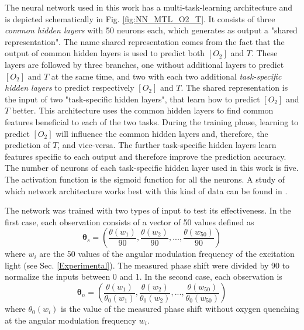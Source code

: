 \documentclass[sensors,article,submit,moreauthors,pdftex,10pt,a4paper]{Definitions/mdpi}
\begin{document}
The neural network used in this work has a multi-task-learning architecture and is depicted schematically in Fig. \ref{fig:NN_MTL_O2_T}. It consists of three {\sl common hidden layers} with 50 neurons each, which generates as output a "shared representation". The name shared representation comes from the fact that the output of common hidden layers is used to predict both $[O_2]$ and $T$. These layers are followed by three branches, one without additional layers to predict $[O_2]$ and $T$ at the same time, and two with each two additional {\sl task-specific hidden layers} to predict respectively $[O_2]$ and $T$. The shared representation is the input of two "task-specific hidden layers", that learn how to predict $[O_2]$ and $T$ better. This architecture uses the common hidden layers to find common features beneficial to each of the two tasks. During the training phase, learning to predict $[O_2]$ will influence the common hidden layers and, therefore, the prediction of $T$, and vice-versa. The further task-specific hidden layers learn features specific to each output and therefore improve the prediction accuracy. The number of neurons of each task-specific hidden layer used in this work is five. The activation function is the sigmoid function for all the neurons.  A study of which network architecture works best with this kind of data can be found in \cite{Michelucci2019_2}.

The network was trained with two types of input to test its effectiveness. In the first case, each observation consists of a vector of 50 values defined as
\begin{equation}
\label{input1}
{\pmb \theta}_s = \left(
\frac{\theta(w_1)}{90} , \frac{\theta(w_2)}{90} , ..., \frac{\theta(w_{50})}{90} 
\right)
\end{equation}
where $w_i$ are the 50 values of the angular modulation frequency of the excitation light (see Sec. \ref{Experimental}). The measured phase shift were divided by 90 to normalize the inputs between 0 and 1. In the second case, each observation is
\begin{equation}
\label{input2}
{\pmb \theta}_n = \left(
\frac{\theta(w_1)}{\theta_0(w_1)} , \frac{\theta(w_2)}{\theta_0(w_2)} , ..., \frac{\theta(w_{50})}{\theta_0(w_{50})} 
\right)
\end{equation}
where $\theta_0(w_i)$ is the value of the measured phase shift without oxygen quenching at the angular modulation frequency $w_i$.
\end{document}
